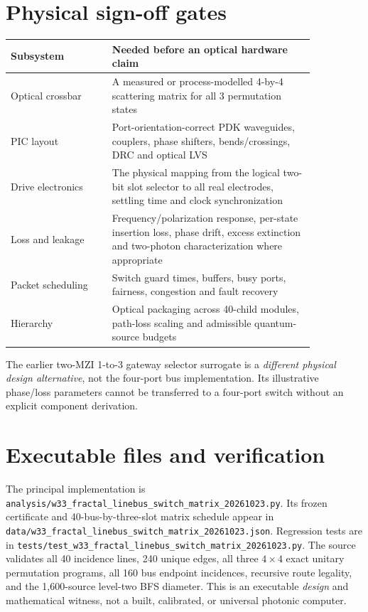 \documentclass[10pt]{article}
\begin{document}
\section{Physical sign-off gates}
\begin{longtable}{p{0.29\linewidth}p{0.56\linewidth}}
\toprule
Subsystem & Needed before an optical hardware claim\\\midrule
Optical crossbar & A measured or process-modelled
4-by-4 scattering matrix for all 3 permutation states\\
PIC layout & Port-orientation-correct PDK waveguides,
couplers, phase shifters, bends/crossings, DRC and optical LVS\\
Drive electronics & The physical mapping from the logical
two-bit slot selector to all real electrodes, settling time
and clock synchronization\\
Loss and leakage & Frequency/polarization response,
per-state insertion loss, phase drift, excess extinction
and two-photon characterization where appropriate\\
Packet scheduling & Switch guard times, buffers, busy
ports, fairness, congestion and fault recovery\\
Hierarchy & Optical packaging across 40-child modules,
path-loss scaling and admissible quantum-source budgets\\
\bottomrule
\end{longtable}
The earlier two-MZI 1-to-3 gateway selector surrogate is a
\emph{different physical design alternative}, not the
four-port bus implementation. Its illustrative phase/loss
parameters cannot be transferred to a four-port switch
without an explicit component derivation.

\section{Executable files and verification}
The principal implementation is
\texttt{analysis/w33\_fractal\_linebus\_switch\_matrix\_20261023.py}.
Its frozen certificate and 40-bus-by-three-slot matrix schedule
appear in
\texttt{data/w33\_fractal\_linebus\_switch\_matrix\_20261023.json}.
Regression tests are in
\texttt{tests/test\_w33\_fractal\_linebus\_switch\_matrix\_20261023.py}.
The source validates all 40 incidence lines, 240 unique edges,
all three $4\times4$ exact unitary permutation programs,
all 160 bus endpoint incidences, recursive route legality,
and the 1,600-source level-two BFS diameter.
This is an executable \emph{design} and mathematical witness,
not a built, calibrated, or universal photonic computer.
\end{document}
